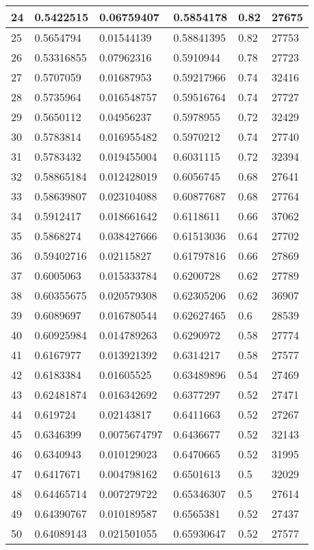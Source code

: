 \begin{longtable}{|l|l|l|l|l|l|}
24 & 0.5422515 & 0.06759407 & 0.5854178 & 0.82 & 27675 \\ \hline 
25 & 0.5654794 & 0.01544139 & 0.58841395 & 0.82 & 27753 \\ \hline 
26 & 0.53316855 & 0.07962316 & 0.5910944 & 0.78 & 27723 \\ \hline 
27 & 0.5707059 & 0.01687953 & 0.59217966 & 0.74 & 32416 \\ \hline 
28 & 0.5735964 & 0.016548757 & 0.59516764 & 0.74 & 27727 \\ \hline 
29 & 0.5650112 & 0.04956237 & 0.5978955 & 0.72 & 32429 \\ \hline 
30 & 0.5783814 & 0.016955482 & 0.5970212 & 0.74 & 27740 \\ \hline 
31 & 0.5783432 & 0.019455004 & 0.6031115 & 0.72 & 32394 \\ \hline 
32 & 0.58865184 & 0.012428019 & 0.6056745 & 0.68 & 27641 \\ \hline 
33 & 0.58639807 & 0.023104088 & 0.60877687 & 0.68 & 27764 \\ \hline 
34 & 0.5912417 & 0.018661642 & 0.6118611 & 0.66 & 37062 \\ \hline 
35 & 0.5868274 & 0.038427666 & 0.61513036 & 0.64 & 27702 \\ \hline 
36 & 0.59402716 & 0.02115827 & 0.61797816 & 0.66 & 27869 \\ \hline 
37 & 0.6005063 & 0.015333784 & 0.6200728 & 0.62 & 27789 \\ \hline 
38 & 0.60355675 & 0.020579308 & 0.62305206 & 0.62 & 36907 \\ \hline 
39 & 0.6089697 & 0.016780544 & 0.62627465 & 0.6 & 28539 \\ \hline 
40 & 0.60925984 & 0.014789263 & 0.6290972 & 0.58 & 27774 \\ \hline 
41 & 0.6167977 & 0.013921392 & 0.6314217 & 0.58 & 27577 \\ \hline 
42 & 0.6183384 & 0.01605525 & 0.63489896 & 0.54 & 27469 \\ \hline 
43 & 0.62481874 & 0.016342692 & 0.6377297 & 0.52 & 27471 \\ \hline 
44 & 0.619724 & 0.02143817 & 0.6411663 & 0.52 & 27267 \\ \hline 
45 & 0.6346399 & 0.0075674797 & 0.6436677 & 0.52 & 32143 \\ \hline 
46 & 0.6340943 & 0.010129023 & 0.6470665 & 0.52 & 31995 \\ \hline 
47 & 0.6417671 & 0.004798162 & 0.6501613 & 0.5 & 32029 \\ \hline 
48 & 0.64465714 & 0.007279722 & 0.65346307 & 0.5 & 27614 \\ \hline 
49 & 0.64390767 & 0.010189587 & 0.6565381 & 0.52 & 27437 \\ \hline 
50 & 0.64089143 & 0.021501055 & 0.65930647 & 0.52 & 27577 \\ \hline 
\end{longtable}